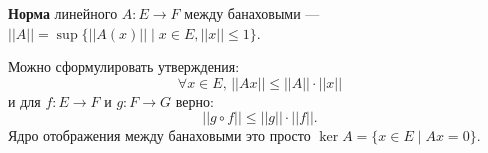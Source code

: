 \begin{to_def}
	\textbf{Норма} линейного $A \colon E \to F$ между банаховыми --- $||A|| = \sup\{||A(x)|| \mid x \in E , ||x|| \leq 1\}$.
\end{to_def}
Можно сформулировать утверждения:
\begin{equation*}
	\forall x \in E, \, ||Ax|| \leq ||A|| \cdot ||x||
\end{equation*}
и для $f \colon E \to F$ и $g \colon F \to G$ верно:
\begin{equation*}
	||g \circ f|| \leq ||g|| \cdot ||f||.
\end{equation*}
Ядро отображения между банаховыми это просто $\ker A = \{x \in E \mid A x = 0\} $.